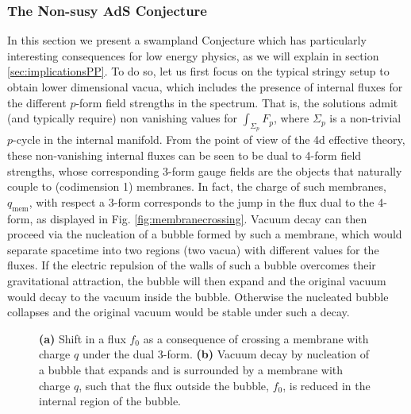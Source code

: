 \documentclass[11pt,a4paper]{article}
\begin{document}
\subsubsection*{The Non-susy AdS Conjecture}
\label{ss:non-susyAdS}

In this section we present a swampland Conjecture which has particularly interesting consequences for low energy physics, as we will explain in section \ref{sec:implicationsPP}. To do so, let us first focus on the typical stringy setup to obtain lower dimensional vacua, which includes the presence of internal fluxes for the different $p$-form field strengths in the spectrum. That is, the solutions admit (and typically require) non vanishing values for $\int_{\Sigma_p} F_p$, where $\Sigma_p$ is a non-trivial $p$-cycle in the internal manifold. From the point of view of the 4d effective theory, these non-vanishing internal fluxes can be seen to be dual to 4-form field strengths, whose corresponding 3-form gauge fields are the objects that  naturally couple to  (codimension 1) membranes.  In fact, the charge of such membranes, $q_{\mathrm{mem}}$, with respect a 3-form corresponds to the jump in the flux dual to the 4-form, as displayed in Fig. \ref{fig:membranecrossing}. Vacuum decay can then proceed via the nucleation of a bubble formed by such a membrane, which would separate spacetime into two regions (two vacua) with different values for the fluxes. If the electric repulsion of the walls of such a bubble overcomes their gravitational attraction, the bubble will then expand and the original vacuum would decay to the vacuum inside the bubble. Otherwise the nucleated bubble collapses and the original vacuum would be stable under such a decay.

\begin{figure}[t]
	\begin{center}
		\qquad \quad 
		\caption{\footnotesize \textbf{(a)} Shift in a flux $f_0$ as a consequence of crossing a membrane with charge $q$ under the dual 3-form. \textbf{(b)} Vacuum decay by nucleation of a bubble that expands and is surrounded by a membrane with charge $q$, such that the flux outside the bubble, $f_0$, is reduced in the internal region of the bubble.}
	\end{center}
\end{figure}  
\end{document}
